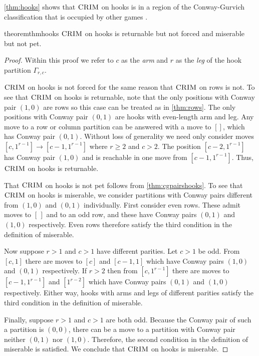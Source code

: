 \documentclass[pdflatex,sn-mathphys-num]{sn-jnl}%
\theoremstyle{thmstyleone}%
\theoremstyle{thmstyletwo}%
\theoremstyle{thmstylethree}%
\newcommand{\crim}{\textsc{CRIM} \/}
\begin{document}
\cref{thm:hooks} shows that $\crim$ on hooks is in a region of the Conway-Gurvich classification that is occupied by other games \cite{gottlieb2025impartialchessintegerpartitions}. 

\begin{restatable}{theorem}{thmhooks} \label{thm:hooks}
    $\crim$ on hooks is returnable but not forced and miserable but not pet. 
\end{restatable}
\begin{proof}
    Within this proof we refer to $c$ as the \emph{arm} and $r$ as the \emph{leg} of the hook partition $\Gamma_{r, c}$.
    
    $\crim$ on hooks is not forced for the same reason that $\crim$ on rows is not. To see that $\crim$ on hooks is returnable, note that the only positions with Conway pair $(1, 0)$ are rows so this case can be treated as in \cref{thm:rows}. The only positions with Conway pair $(0, 1)$ are hooks with even-length arm and leg. Any move to a row or column partition can be answered with a move to $[]$, which has Conway pair $(0, 1)$. Without loss of generality we need only consider moves $[c, 1^{r-1}] \to [c-1, 1^{r-1}]$ where $r \geq 2$ and $c > 2$.  The position $[c-2, 1^{r-1}]$ has Conway pair $(1, 0)$ and is reachable in one move from $[c-1, 1^{r-1}]$. Thus, $\crim$ on hooks is returnable. 
    
    That $\crim$ on hooks is not pet follows from \cref{thm:cgpairshooks}. To see that $\crim$ on hooks is miserable, we consider partitions with Conway pairs different from $(1, 0)$ and $(0, 1)$ individually. 
    First consider even rows. These admit moves to $[\, ]$ and to an odd row, and these have Conway pairs $(0, 1)$ and $(1, 0)$ respectively. Even rows therefore satisfy the third condition in the definition of miserable. 

    Now suppose $r > 1$ and $c > 1$ have different parities. Let $c > 1$ be odd. From $[c, 1]$ there are moves to $[c]$ and $[c-1,1]$ which have Conway pairs $(1, 0)$ and $(0,1)$ respectively. If $r > 2$ then from $[c, 1^{r-1}]$ there are moves to $[c-1, 1^{r-1}]$ and $[1^{r-2}]$ which have Conway pairs $(0, 1)$ and $(1, 0)$ respectively. Either way, hooks with arms and legs of different parities satisfy the third condition in the definition of miserable.

    Finally, suppose $r>1$ and $c>1$ are both odd. Because the Conway pair of such a partition is $(0, 0)$, there can be a move to a partition with Conway pair neither $(0,1)$ nor $(1, 0)$. Therefore, the second condition in the definition of miserable is satisfied. We conclude that $\crim$ on hooks is miserable. 
\end{proof}
\end{document}
